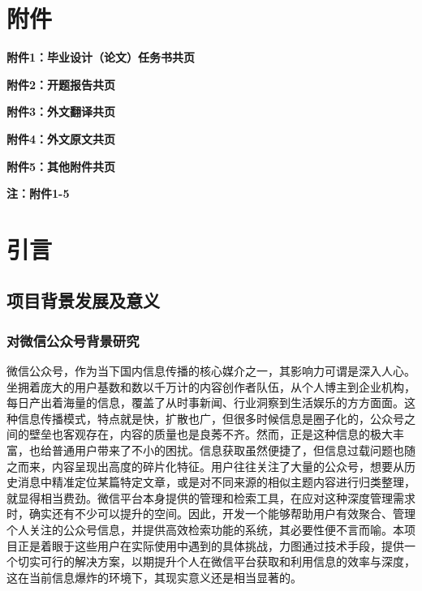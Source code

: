 \documentclass[a4paper,12pt]{ctexart}
\newcommand{\sanhao}{\fontsize{16pt}{24pt}\selectfont}     %
\newcommand{\xiaosihao}{\fontsize{12pt}{18pt}\selectfont}  %
\newcommand{\wuhao}{\fontsize{10.5pt}{15.75pt}\selectfont} %
\newcommand{\startmainmatter}{
    \clearpage
    \pagenumbering{arabic}
    \setcounter{page}{1}
}
\newcommand{\appendixitem}[2]{
    \noindent\songti\xiaosihao\bfseries 附件#1：#2\hfill 共\hspace{1em}\underline{\hspace{2em}}页
}
\begin{document}
\tableofcontents
\clearpage

\section*{\centering\songti\sanhao\bfseries 附\quad 件}
\vspace{2em}

\appendixitem{1}{毕业设计（论文）任务书}
\appendixitem{2}{开题报告}
\appendixitem{3}{外文翻译}
\appendixitem{4}{外文原文}
\appendixitem{5}{其他附件}

\vspace{2em}
\noindent\songti\xiaosihao\bfseries 注：附件1-5\hspace{2em}\underline{\hspace{4em}}

\clearpage

\startmainmatter

\section{引言}

\subsection{项目背景发展及意义}

\subsubsection{对微信公众号背景研究}
\songti\wuhao
微信公众号，作为当下国内信息传播的核心媒介之一，其影响力可谓是深入人心。坐拥着庞大的用户基数和数以千万计的内容创作者队伍，从个人博主到企业机构，每日产出着海量的信息，覆盖了从时事新闻、行业洞察到生活娱乐的方方面面。这种信息传播模式，特点就是快，扩散也广，但很多时候信息是圈子化的，公众号之间的壁垒也客观存在，内容的质量也是良莠不齐。然而，正是这种信息的极大丰富，也给普通用户带来了不小的困扰。信息获取虽然便捷了，但信息过载问题也随之而来，内容呈现出高度的碎片化特征。用户往往关注了大量的公众号，想要从历史消息中精准定位某篇特定文章，或是对不同来源的相似主题内容进行归类整理，就显得相当费劲。微信平台本身提供的管理和检索工具，在应对这种深度管理需求时，确实还有不少可以提升的空间\cite{ref4}。因此，开发一个能够帮助用户有效聚合、管理个人关注的公众号信息，并提供高效检索功能的系统，其必要性便不言而喻。本项目正是着眼于这些用户在实际使用中遇到的具体挑战，力图通过技术手段，提供一个切实可行的解决方案，以期提升个人在微信平台获取和利用信息的效率与深度，这在当前信息爆炸的环境下，其现实意义还是相当显著的\cite{ref7}。
\end{document}
